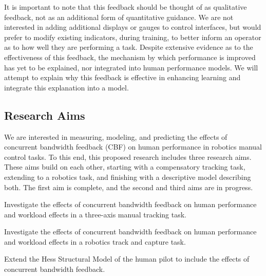 \documentclass[float=false, crop=false]{standalone}
\begin{document}
It is important to note that this feedback should be thought of as qualitative feedback, not as an additional form of quantitative guidance.
We are not interested in adding additional displays or gauges to control interfaces, but would prefer to modify existing indicators, during training, to better inform an operator as to how well they are performing a task.
Despite extensive evidence as to the effectiveness of this feedback, the mechanism by which performance is improved has yet to be explained, nor integrated into human performance models.
We will attempt to explain why this feedback is effective in enhancing learning and integrate this explanation into a model.

\subsection{Research Aims}
We are interested in measuring, modeling, and predicting the effects of concurrent bandwidth feedback (CBF) on human performance in robotics manual control tasks.
To this end, this proposed research includes three research aims.
These aims build on each other, starting with a compensatory tracking task, extending to a robotics task, and finishing with a descriptive model describing both.
The first aim is complete, and the second and third aims are in progress.
\begin{description}[align=left]
\item [Aim One] Investigate the effects of concurrent bandwidth feedback on human performance and workload effects in a three-axis manual tracking task.
\item [Aim Two] Investigate the effects of concurrent bandwidth feedback on human performance and workload effects in a robotics track and capture task.
\item [Aim Three] Extend the Hess Structural Model of the human pilot to include the effects of concurrent bandwidth feedback.
\end{description}
\end{document}
